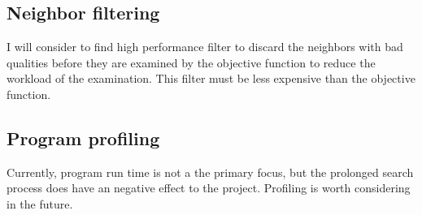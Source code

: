 \documentclass[12pt]{article}
\theoremstyle{definition}
\begin{document}
\subsection{Neighbor filtering}
I will consider to find high performance filter to discard the neighbors with bad qualities before they are examined by the objective function to reduce the workload of the examination. This filter must be less expensive than the objective function.
\subsection{Program profiling}
Currently, program run time is not a the primary focus, but the prolonged search process does have an negative effect to the project. Profiling is worth considering in the future.



\end{document}
